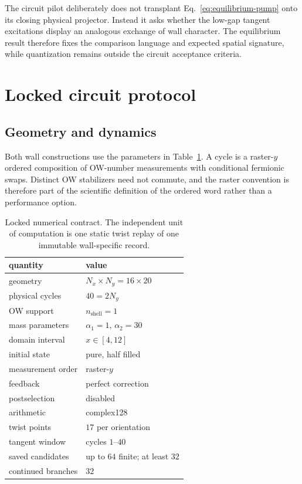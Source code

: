 \documentclass[aps,prb,twocolumn,floatfix,nofootinbib,superscriptaddress]{revtex4-2}
\begin{document}
The circuit pilot deliberately does not transplant Eq.~\eqref{eq:equilibrium-pump}
onto its closing physical projector.  Instead it asks whether the low-gap
tangent excitations display an analogous exchange of wall character.  The
equilibrium result therefore fixes the comparison language and expected
spatial signature, while quantization remains outside the circuit acceptance
criteria.

\section{Locked circuit protocol}

\subsection{Geometry and dynamics}

Both wall constructions use the parameters in Table~\ref{tab:contract}.  A
cycle is a raster-$y$ ordered composition of OW-number measurements with
conditional fermionic swaps.  Distinct OW stabilizers need not commute, and
the raster convention is therefore part of the scientific definition of the
ordered word rather than a performance option.

\begin{table}[b]
\caption{Locked numerical contract.  The independent unit of computation is
one static twist replay of one immutable wall-specific record.}
\label{tab:contract}
\begin{ruledtabular}
\begin{tabular}{ll}
quantity & value \\
\hline
geometry & $N_x\times N_y=16\times20$ \\
physical cycles & $40=2N_y$ \\
OW support & $n_{\mathrm{shell}}=1$ \\
mass parameters & $\alpha_1=1$, $\alpha_2=30$ \\
domain interval & $x\in[4,12]$ \\
initial state & pure, half filled \\
measurement order & raster-$y$ \\
feedback & perfect correction \\
postselection & disabled \\
arithmetic & complex128 \\
twist points & $17$ per orientation \\
tangent window & cycles $1$--$40$ \\
saved candidates & up to $64$ finite; at least $32$ \\
continued branches & $32$
\end{tabular}
\end{ruledtabular}
\end{table}
\end{document}
